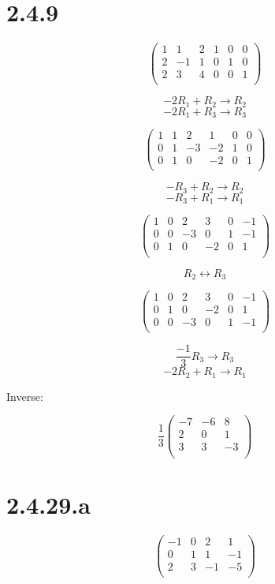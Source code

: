 \documentclass{article}
\begin{document}
\section*{2.4.9}
\[
	\left(
		\begin{array}{ccc|ccc}
			1&	1&	2&	1&	0&	0\\
			2&	-1&	1&	0&	1&	0\\
			2&	3&	4&	0&	0&	1\\
		\end{array}
	\right)
\]

\[	-2R_1 + R_2 \rightarrow R_2 \]
\[	-2R_1 + R_3 \rightarrow R_3 \]

\[
	\left(
		\begin{array}{ccc|ccc}
			1&	1&	2&	1&	0&	0\\
			0&	1&	-3&	-2&	1&	0\\
			0&	1&	0&	-2&	0&	1\\
		\end{array}
	\right)
\]

\[	-R_3 + R_2 \rightarrow R_2	\]
\[	-R_3 + R_1 \rightarrow R_1	\]

\[
	\left(
		\begin{array}{ccc|ccc}
			1&	0&	2&	3&	0&	-1\\
			0&	0&	-3&	0&	1&	-1\\
			0&	1&	0&	-2&	0&	1\\
		\end{array}
	\right)
\]

\[	R_2 \leftrightarrow R_3	\]

\[
	\left(
		\begin{array}{ccc|ccc}
			1&	0&	2&	3&	0&	-1\\
			0&	1&	0&	-2&	0&	1\\
			0&	0&	-3&	0&	1&	-1\\
		\end{array}
	\right)
\]

\[	\frac{-1}{3}R_3 \rightarrow R_3		\]
\[-2R_2+R_1 \rightarrow R_1				\]

Inverse:

\[
	\frac{1}{3}\left(
		\begin{array}{ccc}
			-7&	-6&	8\\
			2&	0&	1\\
			3&	3&	-3\\
		\end{array}
	\right)
\]

\newpage
\section*{2.4.29.a}
\[
	\left(
		\begin{array}{cccc}
			-1&	0&	2&	1\\
			0&	1&	1&	-1\\
			2&	3&	-1&	-5\\
		\end{array}
	\right)
\]
\end{document}
